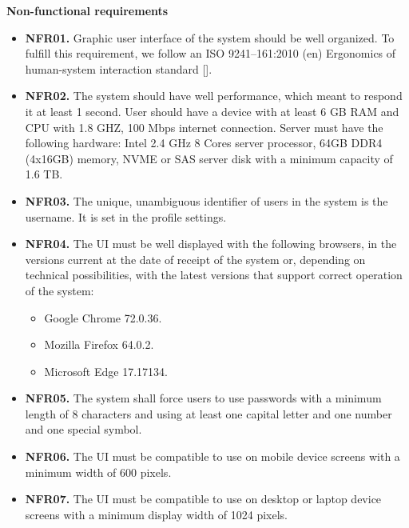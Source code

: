 \textbf{Non-functional requirements}
\begin{itemize}
    \item \textbf{NFR01.} Graphic user interface of the system should be well organized.
    To fulfill this requirement, we follow an ISO 9241--161:2010 (en) Ergonomics of human-system interaction
    standard [\cite{iso2010ergonomics}].
    \item \textbf{NFR02.} The system should have well performance, which meant to respond it at least 1 second.
    User should have a device with at least 6 GB RAM and CPU with 1.8 GHZ, 100 Mbps internet connection.
    Server must have the following hardware: Intel 2.4 GHz 8 Cores server processor, 64GB DDR4 (4x16GB) memory, NVME or SAS
    server disk with a minimum capacity of 1.6 TB\@.
    \item \textbf{NFR03.} The unique, unambiguous identifier of users in the system is the username.
    It is set in the profile settings.
    \item \textbf{NFR04.} The UI must be well displayed with the following browsers, in the versions
    current at the date of receipt of the system or, depending on technical possibilities,
    with the latest versions that support correct operation of the system:
    \begin{itemize}
        \item Google Chrome 72.0.36.
        \item Mozilla Firefox 64.0.2.
        \item Microsoft Edge 17.17134.
    \end{itemize}
    \item \textbf{NFR05.} The system shall force users to use passwords with a minimum length of 8
    characters and using at least one capital letter and one number and one special symbol.
    \item \textbf{NFR06.} The UI must be compatible to use on mobile device screens with a minimum
    width of 600 pixels.
    \item \textbf{NFR07.} The UI must be compatible to use on desktop or laptop device screens with a
    minimum display width of 1024 pixels.
\end{itemize}